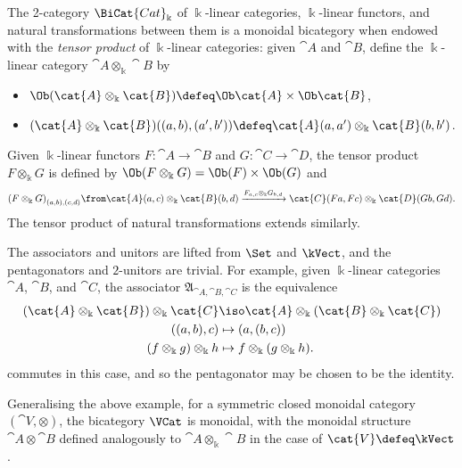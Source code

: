 \begin{example}\label{MonoidalBicatCat}
  The 2-category \(\BiCat{Cat}_{\Bbbk}\) of
  \(\Bbbk\)\hyp{}linear categories,
  \(\Bbbk\)\hyp{}linear functors,
  and natural transformations between them
  is a monoidal bicategory
  when endowed with the \emph{tensor product} of \(\Bbbk\)\hyp{}linear categories:
  given \(\cat{A}\) and \(\cat{B}\), define the \(\Bbbk\)\hyp{}linear category \(\cat{A} \otimes_{\Bbbk} \cat{B}\) by
  \begin{itemize}
    \item \(\Ob(\cat{A} \otimes_{\Bbbk} \cat{B}) \defeq \Ob\cat{A} \times \Ob\cat{B}\),
    \item \((\cat{A}\otimes_{\Bbbk} \cat{B})((a,b),(a',b')) \defeq \cat{A}(a,a') \otimes_{\Bbbk} \cat{B}(b,b')\).
  \end{itemize}
  Given \(\Bbbk\)\hyp{}linear functors \(F\colon \cat{A} \rightarrow \cat{B}\) and \(G\colon \cat{C} \rightarrow \cat{D}\),
  the tensor product \(F \otimes_{\Bbbk} G\) is defined by
  \(\Ob(F\otimes_{\Bbbk} G) = \Ob(F) \times \Ob(G)\) and
  \begin{align*}
    {(F\otimes_{\Bbbk} G)}_{(a, b),(c, d)} \from \cat{A}(a, c) \otimes_{\Bbbk} \cat{B}(b, d) \xrightarrow{F_{a,c} \otimes_{\Bbbk} G_{b,d}} \cat{C}(Fa, Fc) \otimes_{\Bbbk} \cat{D}(Gb, Gd).
  \end{align*}
  The tensor product of natural transformations extends similarly.

  The associators and unitors are lifted from \(\Set\)
  and \(\kVect\),
  and the pentagonators and \(2\)\hyp{}unitors are trivial.
  For example,
  given \(\Bbbk\)\hyp{}linear categories \(\cat{A}\), \(\cat{B}\), and \(\cat{C}\),
  the associator
  \(\mathfrak{A}_{\cat{A}, \cat{B},\cat{C}}\)
  is the equivalence
  \begin{align*}
    (\cat{A} \otimes_{\Bbbk} \cat{B}) \otimes_{\Bbbk} \cat{C} &\iso \cat{A} \otimes_{\Bbbk} (\cat{B} \otimes_{\Bbbk} \cat{C}) \\
    ((a,b),c) &\mapsto (a,(b,c)) \\
    (f \otimes_{\Bbbk} g) \otimes_{\Bbbk} h &\mapsto f \otimes_{\Bbbk} (g \otimes_{\Bbbk} h).
  \end{align*}
   commutes in this case,
  and so the pentagonator may be chosen to be the identity.
\end{example}

Generalising the above example,
for a symmetric closed monoidal category \((\cat{V}, \otimes)\),
the bicategory \(\VCat\) is monoidal,
with the monoidal structure \(\cat{A} \otimes \cat{B}\) defined analogously to \(\cat{A} \otimes_{\Bbbk} \cat{B}\) in the case of \(\cat{V} \defeq \kVect\).

